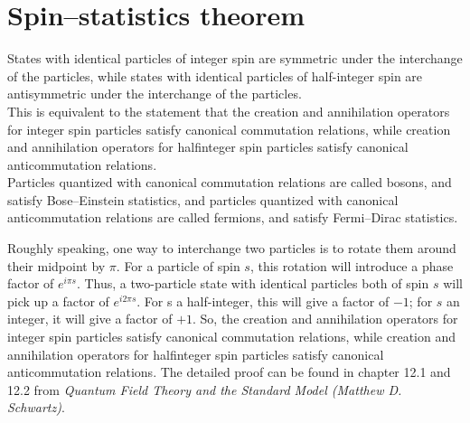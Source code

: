 \documentclass[cyan]{elegantnote}
\begin{document}
\section{Spin–statistics theorem}
\begin{newthem}
States with identical particles of integer spin are symmetric under the interchange of the particles, while states with identical particles of half-integer spin are antisymmetric under the interchange of the particles. \\
This is equivalent to the statement that the creation and annihilation operators for integer spin particles satisfy canonical commutation relations, while creation and annihilation operators for halfinteger spin particles satisfy canonical anticommutation relations. \\
Particles quantized with canonical commutation relations are called bosons, and satisfy Bose–Einstein statistics, and particles quantized with canonical anticommutation relations are called fermions, and satisfy Fermi–Dirac statistics.
\end{newthem}
Roughly speaking,  one way to interchange two particles is to rotate them around their midpoint by $\pi$. For a particle of spin $s$, this rotation will introduce a phase factor of $e^{i\pi s}$. Thus, a two-particle state with identical particles both of spin $s$ will pick up a factor of $e^{i2\pi s}$. For s a half-integer, this will give a factor of $-1$; for $s$ an integer, it will give a factor of $+1$. So, the creation and annihilation operators for integer spin particles satisfy canonical commutation relations, while creation and annihilation operators for halfinteger spin particles satisfy canonical anticommutation relations. The detailed proof can be found in chapter 12.1 and 12.2 from \emph{Quantum Field Theory and the Standard Model (Matthew D. Schwartz)}.
\end{document}
